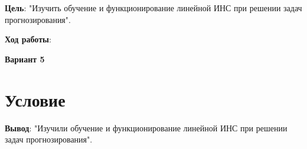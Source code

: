 \textbf{Цель}: "Изучить обучение и функционирование линейной ИНС при решении задач прогнозирования".

\begin{center}
    \textbf{Ход работы}:
\end{center}

\begin{center}
    \textbf{Вариант 5}
\end{center}

\section*{Условие}




\textbf{Вывод}: "Изучили обучение и функционирование линейной ИНС при решении задач прогнозирования".
